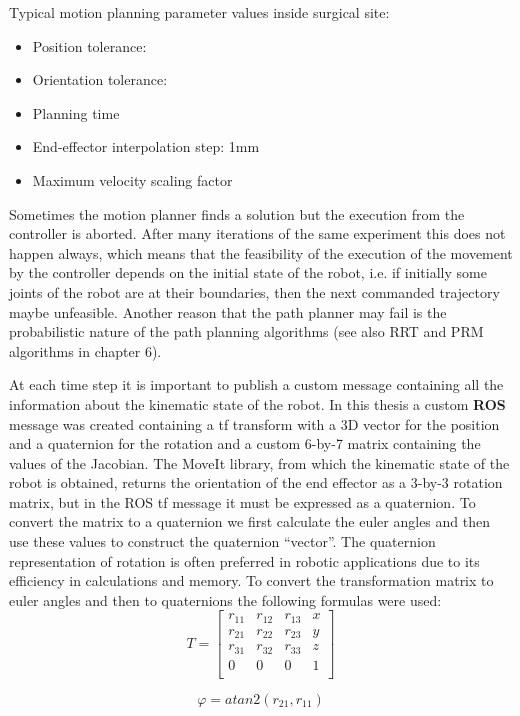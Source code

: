Typical motion planning parameter values inside surgical site:
\begin{itemize}
	\item Position tolerance:
	\item Orientation tolerance:
	\item Planning time
	\item End-effector interpolation step: 1mm
	\item Maximum velocity scaling factor
\end{itemize}

Sometimes the motion planner finds a solution but the execution from the controller is aborted. 
After many iterations of the same experiment this does not happen always, which means that the 
feasibility of the execution of the movement by the controller depends on the initial state of 
the robot, i.e. if initially some joints of the robot are at their boundaries, then the next 
commanded trajectory maybe unfeasible. Another reason that the path planner may fail is the 
probabilistic nature of the path planning algorithms (see also RRT and PRM algorithms in chapter 6).

At each time step it is important to publish a custom message containing all the information 
about the kinematic state of the robot. In this thesis a custom \textbf{ROS} message was created 
containing a tf transform with a 3D vector for the position and a quaternion for the rotation and 
a custom  6-by-7 matrix containing the values of the Jacobian. The MoveIt library, from which the 
kinematic state of the robot is obtained, returns the orientation of the end effector as a 3-by-3 
rotation matrix, but in the ROS tf message it must be expressed as a quaternion. To convert the 
matrix to a quaternion we first calculate the euler angles and then use these values to construct 
the quaternion “vector”. The quaternion representation of rotation is often preferred in robotic 
applications due to its efficiency in calculations and memory. To convert the transformation 
matrix to euler angles and then to quaternions the following formulas were used:
\[
T = 
\begin{bmatrix}
r_{11} & r_{12} & r_{13} & x \\
r_{21} & r_{22} & r_{23} & y \\
r_{31} & r_{32} & r_{33} & z \\
0 & 0 & 0 & 1\\
\end{bmatrix}
\]

\[
φ = atan2(r_{21}, r_{11})
\]

